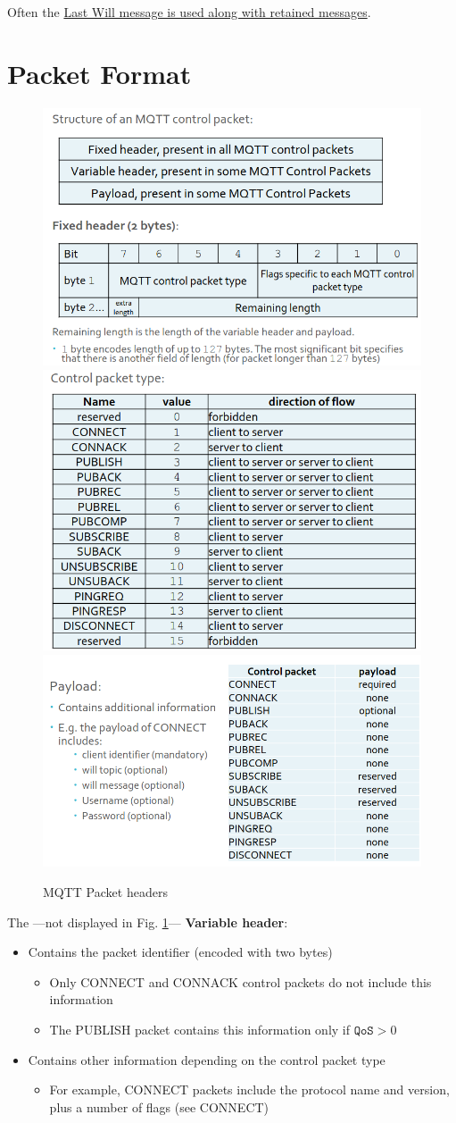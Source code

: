 Often the \ul{Last Will message is used along with retained messages}.

\section{Packet Format}
\begin{figure}[htbp]
   \centering
   \includegraphics[width=0.45\columnwidth]{images/mqtt_packetformat1.png}
   \includegraphics[width=0.45\columnwidth]{images/mqtt_packetformat2.png}\\
   \includegraphics[width=0.45\columnwidth]{images/mqtt_packetformat3.png}
   \caption{MQTT Packet headers}
   \label{fig:mqtt_packetformat}
\end{figure}

The ---not displayed in Fig. \ref{fig:mqtt_packetformat}--- \textbf{Variable header}:
\begin{itemize}
   \item Contains the packet identifier (encoded with two
   bytes)
   \begin{itemize}
      \item Only CONNECT and CONNACK control packets do not
      include this information
      \item The PUBLISH packet contains this information only if $\texttt{QoS}>0$
   \end{itemize}
   \item Contains other information depending on the control
   packet type
   \begin{itemize}
      \item For example, CONNECT packets include the protocol name and version, plus a number of flags (see CONNECT)
   \end{itemize}
\end{itemize}

